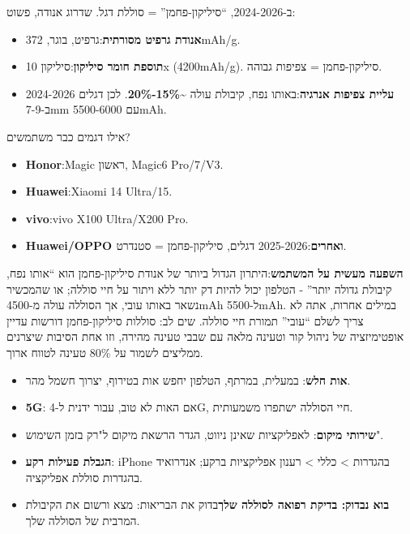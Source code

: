 ב-2024-2026, “סיליקון-פחמן” = סוללת דגל. שדרוג אנודה, פשוט:

\begin{itemize}
  \item \textbf{אנודת גרפיט מסורתית}:גרפיט, בוגר, 372mAh/g.
  \item \textbf{תוספת חומר סיליקון}:סיליקון 10x (4200mAh/g). סיליקון-פחמן = צפיפות גבוהה.
  \item \textbf{עליית צפיפות אנרגיה}:באותו נפח, קיבולת עולה \textasciitilde{}\textbf{15\%-20\%}. לכן דגלים 2024-2026 ב-7-9mm עם 5500-6000mAh.
\end{itemize}

\begin{tcbinfo}{אילו דגמים כבר משתמשים?}
\begin{itemize}
  \item \textbf{Honor}:Magic ראשון, Magic6 Pro/7/V3.
  \item \textbf{Huawei}:Xiaomi 14 Ultra/15.
  \item \textbf{vivo}:vivo X100 Ultra/X200 Pro.
  \item \textbf{Huawei/OPPO ואחרים}:2025-2026 דגלים, סיליקון-פחמן = סטנדרט.
\end{itemize}

\end{tcbinfo}

\textbf{השפעה מעשית על המשתמש}:היתרון הגדול ביותר של אנודת סיליקון-פחמן הוא “אותו נפח, קיבולת גדולה יותר” - הטלפון יכול להיות דק יותר ללא ויתור על חיי סוללה; או שהמכשיר נשאר באותו עובי, אך הסוללה עולה מ-4500mAh ל-5500mAh. במילים אחרות, אתה לא צריך לשלם “עובי” תמורת חיי סוללה. שים לב: סוללות סיליקון-פחמן דורשות עדיין אופטימיזציה של ניהול קור וטעינה מלאה עם שבבי טעינה מהירה, וזו אחת הסיבות שיצרנים ממליצים לשמור על 80\% טעינה לטווח ארוך.


\begin{itemize}
  \item \textbf{אות חלש}: במעלית, במרתף, הטלפון יחפש אות בטירוף, יצרוך חשמל מהר.
  \item \textbf{5G}: אם האות לא טוב, עבור ידנית ל-4G, חיי הסוללה ישתפרו משמעותית.
  \item \textbf{שירותי מיקום}: לאפליקציות שאינן ניווט, הגדר הרשאת מיקום ל"רק בזמן השימוש".
  \item \textbf{הגבלת פעילות רקע}: iPhone בהגדרות > כללי > רענון אפליקציות ברקע; אנדרואיד בהגדרות סוללת אפליקציה.
  \item \textbf{בוא נבדוק: בדיקת רפואה לסוללה שלך}בדוק את הבריאות: מצא ורשום את הקיבולת המרבית של הסוללה שלך.
\end{itemize}

